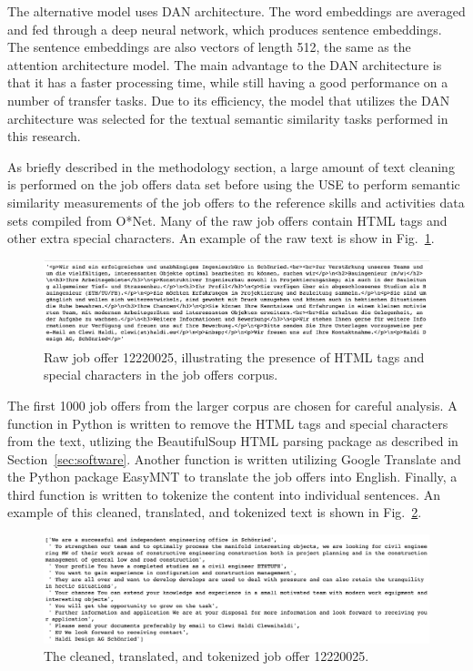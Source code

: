 The alternative model uses DAN architecture. The word embeddings are averaged and fed through a deep neural network, which produces sentence embeddings.  The sentence embeddings are also vectors of length 512, the same as the attention architecture model. The main advantage to the DAN architecture is that it has a faster processing time, while still having a good performance on a number of transfer tasks. Due to its efficiency, the model that utilizes the DAN architecture was selected for the textual semantic similarity tasks performed in this research. 


As briefly described in the methodology section, a large amount of text cleaning is performed on the job offers data set before using the USE to perform semantic similarity measurements of the job offers to the reference skills and activities data sets compiled from O*Net. Many of the raw job offers contain HTML tags and other extra special characters. An example of the raw text is show in Fig.~\ref{fig:messytext}.

\begin{figure}[htbp]
  \centering
    \includegraphics[width=1.0\textwidth]{figures/MessyText.pdf}
    \caption{
    Raw job offer 12220025, illustrating the presence of HTML tags and special characters in the job offers corpus. 
    }
\label{fig:messytext}
\end{figure}

The first 1000 job offers from the larger corpus are chosen for careful analysis. A function in Python is written to remove the HTML tags and special characters from the text, utlizing the BeautifulSoup HTML parsing package as described in Section~\ref{sec:software}. Another function is written utilizing Google Translate and the Python package EasyMNT to translate the job offers into English. Finally, a third function is written to tokenize the content into individual sentences. An example of this cleaned, translated, and tokenized text is shown in Fig.~\ref{fig:cleanedtext}.

\begin{figure}[htbp]
  \centering
    \includegraphics[width=1.0\textwidth]{figures/cleanedtext.pdf}
    \caption{
    The cleaned, translated, and tokenized job offer 12220025. 
    }
\label{fig:cleanedtext}
\end{figure}

